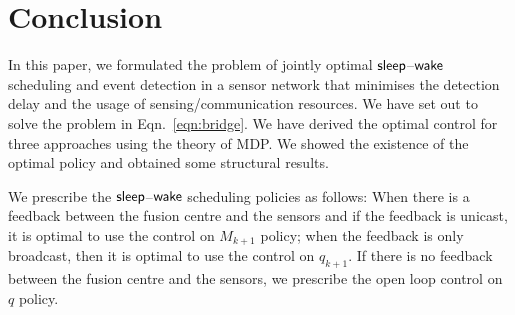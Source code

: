 \documentclass[journal]{IEEEtran}
\newcommand{\sleep}{{${\sf sleep }$}}
\begin{document}
\section{Conclusion}
\label{sec:conclusion}
In this paper, we formulated the problem of jointly optimal
\sleep--${\sf wake}$ scheduling and event detection in a sensor network
that minimises the detection delay and the usage of
sensing/communication resources. We have set out to solve the problem in
Eqn.~\ref{eqn:bridge}. We have derived the optimal control for three
approaches using the theory of MDP. We showed the existence of the
optimal policy and obtained some structural results.  

We prescribe the \sleep--${\sf wake}$ scheduling policies as follows:
When there is a feedback between the fusion centre and the sensors and
if the feedback is unicast, it is optimal to use the control on
$M_{k+1}$ policy; when the feedback is only broadcast, then it is 
optimal to use the control on $q_{k+1}$. If there is no feedback between 
the fusion centre and the sensors, we prescribe the open loop control on 
$q$ policy.




\appendices
{}
\label{sec:appendix}
\end{document}
